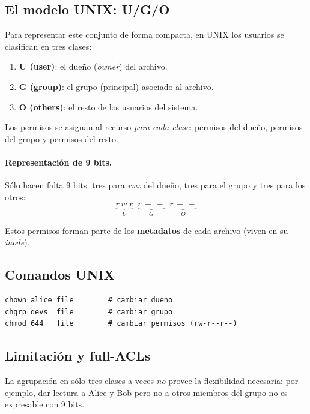 \documentclass[11pt,a4paper]{article}
\begin{document}
\subsection{El modelo UNIX: U/G/O}

Para representar este conjunto de forma compacta, en UNIX los usuarios
se clasifican en tres clases:

\begin{enumerate}[leftmargin=*]
    \item \textbf{U (user)}: el dueño (\emph{owner}) del archivo.
    \item \textbf{G (group)}: el grupo (principal) asociado al archivo.
    \item \textbf{O (others)}: el resto de los usuarios del sistema.
\end{enumerate}

Los permisos se asignan al recurso \emph{para cada clase}: permisos
del dueño, permisos del grupo y permisos del resto.

\paragraph{Representación de 9 bits.}
Sólo hacen falta 9 bits: tres para \emph{rwx} del dueño, tres para el
grupo y tres para los otros:
\[
\underbrace{r\,w\,x}_{U} \;\; \underbrace{r\,-\,-}_{G} \;\; \underbrace{r\,-\,-}_{O}
\]

Estos permisos forman parte de los \textbf{metadatos} de cada archivo
(viven en su \emph{inode}).

\subsection{Comandos UNIX}

\begin{lstlisting}[style=shellstyle]
chown alice file        # cambiar dueno
chgrp devs  file        # cambiar grupo
chmod 644   file        # cambiar permisos (rw-r--r--)
\end{lstlisting}

\subsection{Limitación y full-ACLs}

\begin{idea}
La agrupación en sólo tres clases a veces \emph{no} provee la
flexibilidad necesaria: por ejemplo, dar lectura a Alice y Bob pero no
a otros miembros del grupo no es expresable con 9 bits.
\end{idea}
\end{document}

